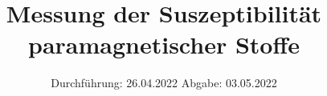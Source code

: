 

\subject{V606}
\title{Messung der Suszeptibilität paramagnetischer Stoffe}
\date{%
  Durchführung: 26.04.2022
  \hspace{3em}
  Abgabe: 03.05.2022
}



\maketitle
\thispagestyle{empty}
\tableofcontents
\newpage






\printbibliography{}





